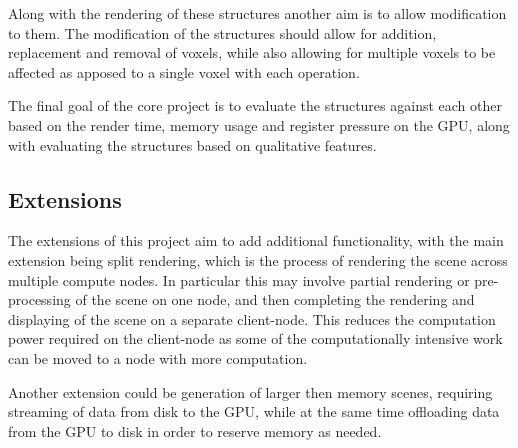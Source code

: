 Along with the rendering of these structures another aim is to allow
modification to them. The modification of the structures should allow
for addition, replacement and removal of voxels, while also allowing
for multiple voxels to be affected as apposed to a single voxel with
each operation.

The final goal of the core project is to evaluate the structures against each
other based on the render time, memory usage and register pressure on
the GPU, along
with evaluating the structures based on qualitative features.

\subsection*{Extensions}
The extensions of this project aim to add additional functionality,
with the main extension being split rendering, which is the process of
rendering the scene across multiple compute nodes. In particular this
may involve partial rendering or pre-processing of the scene on one node, and
then completing the rendering and displaying of the scene on a separate
client-node. This reduces the computation power required on the
client-node as some of the computationally intensive work can be
moved to a node with more computation.

Another extension could be generation of larger then memory scenes,
requiring streaming of data from disk to the GPU, while at the same
time offloading data from the GPU to disk in order to reserve memory
as needed.

